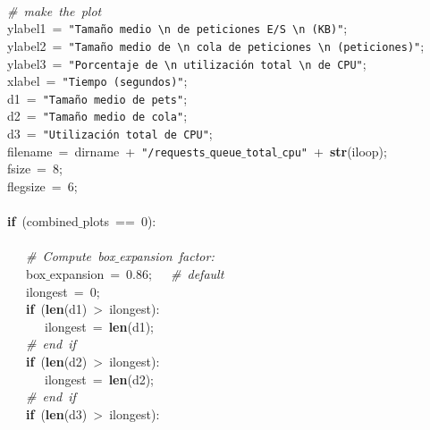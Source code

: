 \mbox{}\ \ \  \\
\mbox{}\ \ \ \textit{\#\ make\ the\ plot} \\
\mbox{}\ \ \ ylabel1\ =\ \texttt{"{}Tamaño\ medio\ \textbackslash{}n\ de\ peticiones\ E/S\ \textbackslash{}n\ (KB)"{}}; \\
\mbox{}\ \ \ ylabel2\ =\ \texttt{"{}Tamaño\ medio\ de\ \textbackslash{}n\ cola\ de\ peticiones\ \textbackslash{}n\ (peticiones)"{}}; \\
\mbox{}\ \ \ ylabel3\ =\ \texttt{"{}Porcentaje\ de\ \textbackslash{}n\ utilización\ total\ \textbackslash{}n\ de\ CPU"{}}; \\
\mbox{}\ \ \ xlabel\ =\ \texttt{"{}Tiempo\ (segundos)"{}}; \\
\mbox{}\ \ \ d1\ =\ \texttt{"{}Tamaño\ medio\ de\ pets"{}}; \\
\mbox{}\ \ \ d2\ =\ \texttt{"{}Tamaño\ medio\ de\ cola"{}}; \\
\mbox{}\ \ \ d3\ =\ \texttt{"{}Utilización\ total\ de\ CPU"{}}; \\
\mbox{}\ \ \ filename\ =\ dirname\ +\ \texttt{"{}/requests$\_$queue$\_$total$\_$cpu"{}}\ +\ \textbf{str}(iloop); \\
\mbox{}\ \ \ fsize\ =\ 8; \\
\mbox{}\ \ \ flegsize\ =\ 6; \\
\mbox{}\ \ \  \\
\mbox{}\ \ \ \textbf{if}\ (combined$\_$plots\ ==\ 0): \\
\mbox{}\ \ \ \ \ \  \\
\mbox{}\ \ \ \ \ \ \textit{\#\ Compute\ box$\_$expansion\ factor:} \\
\mbox{}\ \ \ \ \ \ box$\_$expansion\ =\ 0.86;\ \ \ \textit{\#\ default} \\
\mbox{}\ \ \ \ \ \ ilongest\ =\ 0; \\
\mbox{}\ \ \ \ \ \ \textbf{if}\ (\textbf{len}(d1)\ \textgreater{}\ ilongest): \\
\mbox{}\ \ \ \ \ \ \ \ \ ilongest\ =\ \textbf{len}(d1); \\
\mbox{}\ \ \ \ \ \ \textit{\#\ end\ if} \\
\mbox{}\ \ \ \ \ \ \textbf{if}\ (\textbf{len}(d2)\ \textgreater{}\ ilongest): \\
\mbox{}\ \ \ \ \ \ \ \ \ ilongest\ =\ \textbf{len}(d2); \\
\mbox{}\ \ \ \ \ \ \textit{\#\ end\ if} \\
\mbox{}\ \ \ \ \ \ \textbf{if}\ (\textbf{len}(d3)\ \textgreater{}\ ilongest): \\
